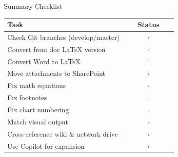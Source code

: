 \documentclass{beamer}
\begin{document}
	\begin{frame}{Summary Checklist}
		\begin{table}
			\centering
			\begin{tabular}{|p{0.7\linewidth}|c|}
				\hline
				\textbf{Task} & \textbf{Status} \\
				\hline
				Check Git branches (develop/master) & $\square$ \\
				Convert from doc \LaTeX{} version & $\square$ \\
				Convert Word to \LaTeX & $\square$ \\
				Move attachments to SharePoint & $\square$ \\
				Fix math equations & $\square$ \\
				Fix footnotes & $\square$ \\
				Fix chart numbering & $\square$ \\
				Match visual output & $\square$ \\
				Cross-reference wiki \& network drive & $\square$ \\
				Use Copilot for expansion & $\square$ \\
				\hline
			\end{tabular}
		\end{table}
	\end{frame}
	
\end{document}
